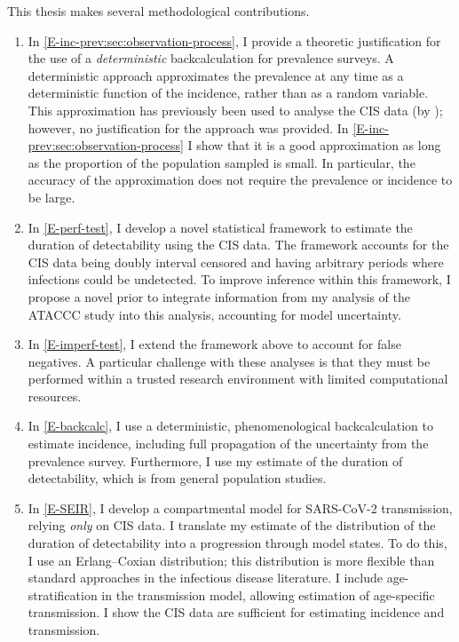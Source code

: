 \documentclass[thesis.tex]{subfiles}
\begin{document}
This thesis makes several methodological contributions.
\begin{enumerate}
    \item In \cref{E-inc-prev:sec:observation-process}, I provide a theoretic justification for the use of a \emph{deterministic} backcalculation for prevalence surveys.
    A deterministic approach approximates the prevalence at any time as a deterministic function of the incidence, rather than as a random variable.
    This approximation has previously been used to analyse the CIS data (\eg by \textcite{abbottCISincidence}); however, no justification for the approach was provided.
    In \cref{E-inc-prev:sec:observation-process} I show that it is a good approximation as long as the proportion of the population sampled is small.
    In particular, the accuracy of the approximation does not require the prevalence or incidence to be large.
    
    \item In \cref{E-perf-test}, I develop a novel statistical framework to estimate the duration of detectability using the CIS data.
    The framework accounts for the CIS data being doubly interval censored and having arbitrary periods where infections could be undetected.
    To improve inference within this framework, I propose a novel prior to integrate information from my analysis of the ATACCC study into this analysis, accounting for model uncertainty.
    
    \item In \cref{E-imperf-test}, I extend the framework above to account for false negatives.
    A particular challenge with these analyses is that they must be performed within a trusted research environment with limited computational resources.

    \item In \cref{E-backcalc}, I use a deterministic, phenomenological backcalculation to estimate incidence, including full propagation of the uncertainty from the prevalence survey.
    Furthermore, I use my estimate of the duration of detectability, which is from general population studies.
    
    \item In \cref{E-SEIR}, I develop a compartmental model for SARS-CoV-2 transmission, relying \emph{only} on CIS data. 
    I translate my estimate of the distribution of the duration of detectability into a progression through model states.
    To do this, I use an Erlang--Coxian distribution; this distribution is more flexible than standard approaches in the infectious disease literature.
    I include age-stratification in the transmission model, allowing estimation of age-specific transmission.
    I show the CIS data are sufficient for estimating incidence and transmission.
\end{enumerate}
\end{document}
